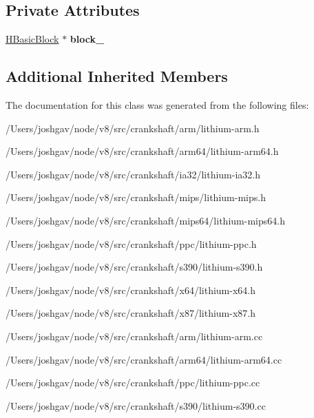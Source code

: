 \subsection*{Private Attributes}
\begin{DoxyCompactItemize}
\item 
\hyperlink{classv8_1_1internal_1_1_h_basic_block}{H\+Basic\+Block} $\ast$ {\bfseries block\+\_\+}\hypertarget{classv8_1_1internal_1_1_l_goto_a2cfe6812ecbe43dd1c0ff12a49d4cdcf}{}\label{classv8_1_1internal_1_1_l_goto_a2cfe6812ecbe43dd1c0ff12a49d4cdcf}

\end{DoxyCompactItemize}
\subsection*{Additional Inherited Members}


The documentation for this class was generated from the following files\+:\begin{DoxyCompactItemize}
\item 
/\+Users/joshgav/node/v8/src/crankshaft/arm/lithium-\/arm.\+h\item 
/\+Users/joshgav/node/v8/src/crankshaft/arm64/lithium-\/arm64.\+h\item 
/\+Users/joshgav/node/v8/src/crankshaft/ia32/lithium-\/ia32.\+h\item 
/\+Users/joshgav/node/v8/src/crankshaft/mips/lithium-\/mips.\+h\item 
/\+Users/joshgav/node/v8/src/crankshaft/mips64/lithium-\/mips64.\+h\item 
/\+Users/joshgav/node/v8/src/crankshaft/ppc/lithium-\/ppc.\+h\item 
/\+Users/joshgav/node/v8/src/crankshaft/s390/lithium-\/s390.\+h\item 
/\+Users/joshgav/node/v8/src/crankshaft/x64/lithium-\/x64.\+h\item 
/\+Users/joshgav/node/v8/src/crankshaft/x87/lithium-\/x87.\+h\item 
/\+Users/joshgav/node/v8/src/crankshaft/arm/lithium-\/arm.\+cc\item 
/\+Users/joshgav/node/v8/src/crankshaft/arm64/lithium-\/arm64.\+cc\item 
/\+Users/joshgav/node/v8/src/crankshaft/ppc/lithium-\/ppc.\+cc\item 
/\+Users/joshgav/node/v8/src/crankshaft/s390/lithium-\/s390.\+cc\end{DoxyCompactItemize}
